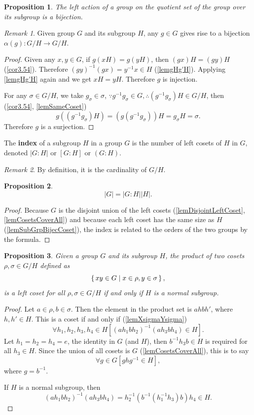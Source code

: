 \documentclass[12pt, letterpaper]{article}
\newtheorem{prop}{Proposition}[section]
\theoremstyle{definition}
\theoremstyle{remark}
\newtheorem*{rem*}{Remark}
\theoremstyle{definition}
\theoremstyle{plain}
\numberwithin{equation}{section}
\begin{document}
	\begin{prop}\label{lemBijectiveAction}
		The left action of a group on the quotient set of the group over its subgroup is a bijection.
	\end{prop}
	\begin{rem*}
		Given group $G$ and its subgroup $H$, any $g\in G$ gives rise to a bijection
		$\alpha(g)\colon G/H\to G/H$.
	\end{rem*}
	\begin{proof}
		Given any $x,y\in G$,
		if $g(xH)=g(yH)$, then 
		$(gx)H=(gy)H$ (\autoref{cor3.54}). Therefore $(gy)^{-1}(gx)=y^{-1}x\in H$ (\autoref{lemgHg'H}).
		Applying \autoref{lemgHg'H} again and we get $xH = yH$. Therefore $g$ is injection.
		
		For any $\sigma\in G/H$, we take $g_\sigma\in\sigma$, 
		$\because g^{-1}g_\sigma\in G,\therefore (g^{-1}g_\sigma)H\in G/H$,
		then (\autoref{cor3.54}, \autoref{lemSameCoset})
		\[g((g^{-1}g_\sigma)H)= (g(g^{-1}g_\sigma))H=g_\sigma H=\sigma.\]
		Therefore $g$ is a surjection.
	\end{proof}

	\begin{def*}[index]
		The \textbf{index} of a subgroup $H$ in a group $G$ is the number of left cosets of $H$ in $G$,
		denoted $|G:H|$ or $[G:H]$ or $(G:H)$.		
	\end{def*}
	\begin{rem*}
		By definition, it is the cardinality of $G/H$.
	\end{rem*}
	\begin{prop}\label{prop|G|=|G:H||H|}
		 \[|G|=|G:H||H|.\]
	\end{prop}
	\begin{proof}
		Because $G$ is the disjoint union of the left cosets (\autoref{lemDisjointLeftCoset}, \autoref{lemCosetsCoverAll})
		and because each left coset has the same size as $H$ (\autoref{lemSubGrpBijecCoset}),
		the index is related to the orders of the two groups by the formula.
	\end{proof}

	\begin{prop}
		Given a group $G$ and its subgroup $H$,
		the product of two cosets $\rho,\sigma\in G/H$ defined as
		\[\set{xy\in G|x\in\rho ,y\in\sigma},\]
		is a left coset for all $\rho,\sigma\in G/H$ if and only if $H$ is a normal subgroup.
	\end{prop}
	\begin{proof}
		Let $a\in \rho, b\in\sigma$. Then the element in the product set is
		$ahbh'$, where $h,h'\in H$. This is a coset if and only if (\autoref{lemXsigmaYsigma})
		\[\forall h_1,h_2,h_3,h_4\in H[(ah_1bh_2)^{-1}(ah_3bh_4)\in H].
		\]
		Let $h_1=h_2=h_4=e$, the identity in $G$ (and $H$), then $b^{-1}h_3b\in H$ is required
		for all $h_3\in H$.
		Since the union of all cosets is $G$ (\autoref{lemCosetsCoverAll}),
		this is to say
		\[\forall g \in G [ghg^{-1}\in H],\]
		where $g=b^{-1}$.
		
		If $H$ is a normal subgroup, then \[(ah_1bh_2)^{-1}(ah_3bh_4)=h_2^{-1}(b^{-1}(h_1^{-1}h_3)b)h_4\in H.\]
	\end{proof}
	
\end{document}
